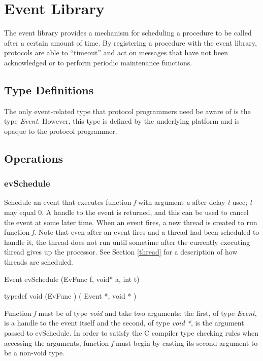 % 
%
%

\section{Event Library}

The event library provides a mechanism for scheduling a procedure to
be called after a certain amount of time. By registering a procedure
with the event library, protocols are able to ``timeout'' and act on
messages that have not been acknowledged or to perform periodic
maintenance functions. 

\subsection{Type Definitions}

The only event-related type that protocol programmers need be
aware of is the type {\em Event}. However, this type is defined
by the underlying platform and is opaque to the protocol programmer.

\subsection{Operations}

\subsubsection{evSchedule}

Schedule an event that executes function {\em f} with argument {\em a}
after delay {\em t} usec; {\em t} may equal 0.  A handle to the event
is returned, and this can be used to cancel the event at some later
time.  When an event fires, a new thread is created to run function
{\em f}. Note that even after an event fires and a thread had been
scheduled to handle it, the thread does not run until sometime
after the currently executing thread gives up the processor.  See
Section \ref{thread} for a description of how threads are scheduled.
\medskip

{\sem Event} {\bold evSchedule} ({\sem EvFunc} {\caps f}, {\sem void}*
{\caps a}, {\sem int} {\caps t})

{\sem typedef void} ({\bold * EvFunc} )
( {\sem Event} *, {\sem void} * )


\medskip

Function {\em f} must be of type {\em void} and take two arguments:
the first, of type {\em Event}, is a handle to the event itself
and the second,
of type {\em void *}, is the argument passed to evSchedule.  
In order to satisfy the C compiler type checking
rules when accessing the arguments, function {\em f} must
begin by casting its second argument to be a non-void type.


